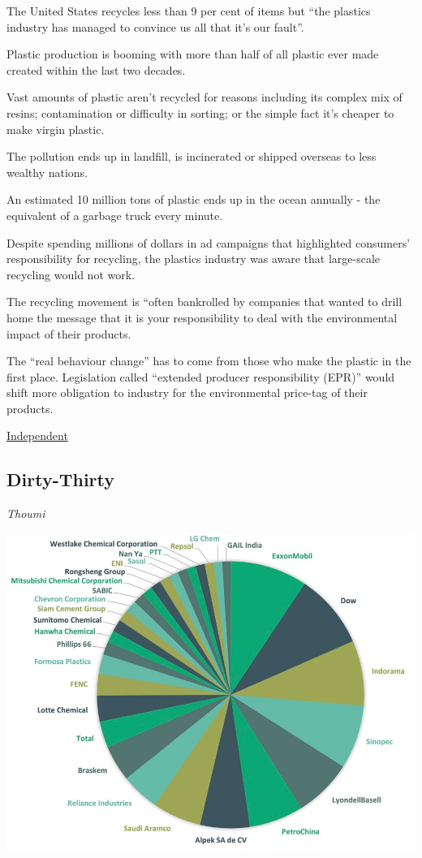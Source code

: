 \documentclass[
]{book}
\begin{document}
The United States recycles less than 9 per cent of items
but ``the plastics industry has managed to convince us all that it's our fault''.

Plastic production is booming with more than half of all plastic ever made
created within the last two decades.

Vast amounts of plastic aren't recycled for reasons including its complex mix of resins;
contamination or difficulty in sorting; or the simple fact it's cheaper to make virgin plastic.

The pollution ends up in landfill, is incinerated or shipped overseas to less wealthy nations.

An estimated 10 million tons of plastic ends up in the ocean annually -
the equivalent of a garbage truck every minute.

Despite spending millions of dollars in ad campaigns that highlighted consumers' responsibility for recycling, the plastics industry was aware that large-scale recycling would not work.

The recycling movement is ``often bankrolled by companies that wanted to drill home
the message that it is your responsibility
to deal with the environmental impact of their products.

The ``real behaviour change'' has to come from those who make the plastic in the first place.
Legislation called ``extended producer responsibility (EPR)''
would shift more obligation to industry for the environmental price-tag of their products.

\href{https://www.independent.co.uk/climate-change/news/john-oliver-plastics-recycling-b1820614.html}{Independent}

\hypertarget{dirty-thirty}{%
\subsection{Dirty-Thirty}\label{dirty-thirty}}

\emph{Thoumi}

\includegraphics{fig/Dirty-Thirty.png}
\end{document}
